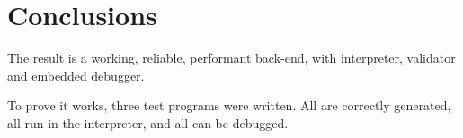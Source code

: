 \section{Conclusions}
The result is a working, reliable, performant back-end, with interpreter, validator and embedded debugger.

To prove it works, three test programs were written.
All are correctly generated, all run in the interpreter, and all can be debugged.

